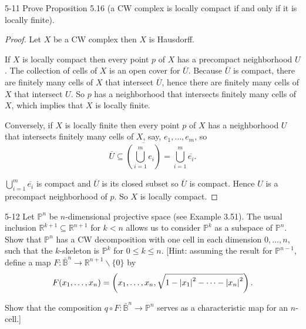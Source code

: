 \begin{problem}{5-11}\label{problem:5-11}
Prove Proposition 5.16 (a CW complex is locally compact if and only if it is locally finite).
\end{problem}

\begin{proof}
	Let \( X \) be a CW complex then \( X \) is Hausdorff.

	If \( X \) is locally compact then every point \( p \) of \( X \) has a precompact neighborhood \( U \). The collection of cells of \( X \) is an open cover for \( \overline{U} \). Because \( \overline{U} \) is compact, there are finitely many cells of \( X \) that intersect \( \overline{U} \), hence there are finitely many cells of \( X \) that intersect \( U \). So \( p \) has a neighborhood that intersects finitely many cells of \( X \), which implies that \( X \) is locally finite.

	Conversely, if \( X \) is locally finite then every point \( p \) of \( X \) has a neighborhood \( U \) that intersects finitely many cells of \( X \), say, \( e_{1}, \ldots, e_{m} \), so
	\[
		\overline{U} \subseteq \overline{\left(\bigcup^{m}_{i=1} e_{i}\right)} = \bigcup^{m}_{i=1} \overline{e_{i}}.
	\]

	\( \bigcup^{m}_{i=1} \overline{e_{i}} \) is compact and \( \overline{U} \) is its closed subset so \( \overline{U} \) is compact. Hence \( U \) is a precompact neighborhood of \( p \). So \( X \) is locally compact.
\end{proof}

\begin{problem}{5-12}\label{problem:5-12}
Let \( \mathbb{P}^{n} \) be \( n \)-dimensional projective space (see Example 3.51). The usual inclusion \( \mathbb{R}^{k+1} \subseteq \mathbb{R}^{n+1} \) for \( k < n \) allows us to consider \( \mathbb{P}^{k} \) as a subspace of \( \mathbb{P}^{n} \). Show that \( \mathbb{P}^{n} \) has a CW decomposition with one cell in each dimension \( 0, \dots, n \), such that the \( k \)-skeleton is \( \mathbb{P}^{k} \) for \(0 \le k \le n\). [Hint: assuming the result for \(\mathbb{P}^{n-1}\), define a map \( F : \mathbb{\bar{B}}^n \rightarrow \mathbb{R}^{n+1} \smallsetminus \{0\} \) by
		\[
			F(x_{1}, \ldots, x_{n}) = \left(x_{1}, \dots, x_{n}, \sqrt{1 - \left\vert{x_{1}}\right\vert^{2} - \cdots - \left\vert{x_{n}}\right\vert^{2}} \right).
		\]

		Show that the composition \( q \circ F : \mathbb{\bar{\mathbb{B}}}^{n} \rightarrow \mathbb{P}^{n} \) serves as a characteristic map for an \( n \)-cell.]
\end{problem}

